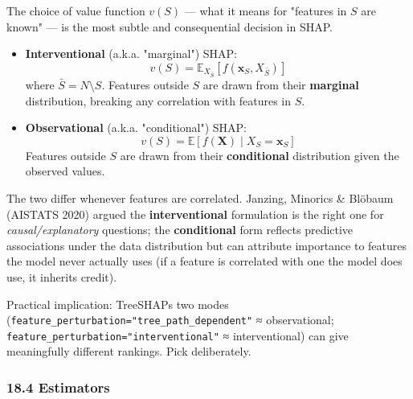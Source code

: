 \documentclass{article}
\begin{document}
The choice of value function \(v(S)\) --- what it means for "features in
\(S\) are known" --- is the most subtle and consequential decision in
SHAP.

\begin{itemize}
\item
  \textbf{Interventional} (a.k.a. "marginal") SHAP: \[
  v(S) = \mathbb{E}_{X_{\bar{S}}}[f(\mathbf{x}_S, X_{\bar{S}})]
  \] where \(\bar{S} = N \setminus S\). Features outside \(S\) are drawn
  from their \textbf{marginal} distribution, breaking any correlation
  with features in \(S\).
\item
  \textbf{Observational} (a.k.a. "conditional") SHAP: \[
  v(S) = \mathbb{E}[f(\mathbf{X}) \mid X_S = \mathbf{x}_S]
  \] Features outside \(S\) are drawn from their \textbf{conditional}
  distribution given the observed values.
\end{itemize}

The two differ whenever features are correlated. Janzing, Minorics \&
Blöbaum (AISTATS 2020) argued the \textbf{interventional} formulation is
the right one for \emph{causal/explanatory} questions; the
\textbf{conditional} form reflects predictive associations under the
data distribution but can attribute importance to features the model
never actually uses (if a feature is correlated with one the model does
use, it inherits credit).

Practical implication: TreeSHAP\textquotesingle s two modes
(\texttt{feature\_perturbation="tree\_path\_dependent"} ≈ observational;
\texttt{feature\_perturbation="interventional"} ≈ interventional) can
give meaningfully different rankings. Pick deliberately.

\subsubsection{18.4 Estimators}\label{184-estimators}
\end{document}
